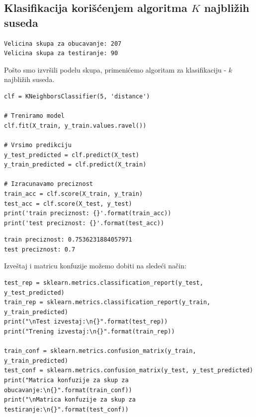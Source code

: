 \documentclass[12pt,a4paper]{article}
\begin{document}
\subsection{Klasifikacija kori\v s\' cenjem algoritma $K$ najbli\v zih suseda}

\begin{verbatim}
Velicina skupa za obucavanje: 207
Velicina skupa za testiranje: 90
\end{verbatim}

Po\v sto smo izvr\v sili podelu skupa, primeni\' cemo algoritam za klasifikaciju - $k$ najbli\v zih suseda.

\begin{lstlisting}
clf = KNeighborsClassifier(5, 'distance')

# Treniramo model
clf.fit(X_train, y_train.values.ravel())

# Vrsimo predikciju
y_test_predicted = clf.predict(X_test)
y_train_predicted = clf.predict(X_train)

# Izracunavamo preciznost
train_acc = clf.score(X_train, y_train)
test_acc = clf.score(X_test, y_test)
print('train preciznost: {}'.format(train_acc))
print('test preciznost: {}'.format(test_acc))
\end{lstlisting}

\begin{verbatim}
train preciznost: 0.7536231884057971
test preciznost: 0.7
\end{verbatim}

Izve\v staj i matricu konfuzije mo\v zemo dobiti na slede\' ci na\v cin:

\begin{lstlisting}
test_rep = sklearn.metrics.classification_report(y_test, y_test_predicted)
train_rep = sklearn.metrics.classification_report(y_train, y_train_predicted)
print("\nTest izvestaj:\n{}".format(test_rep))
print("Trening izvestaj:\n{}".format(train_rep))

train_conf = sklearn.metrics.confusion_matrix(y_train, y_train_predicted)
test_conf = sklearn.metrics.confusion_matrix(y_test, y_test_predicted)
print("Matrica konfuzije za skup za obucavanje:\n{}".format(train_conf))
print("\nMatrica konfuzije za skup za testiranje:\n{}".format(test_conf))
\end{lstlisting}
\end{document}
